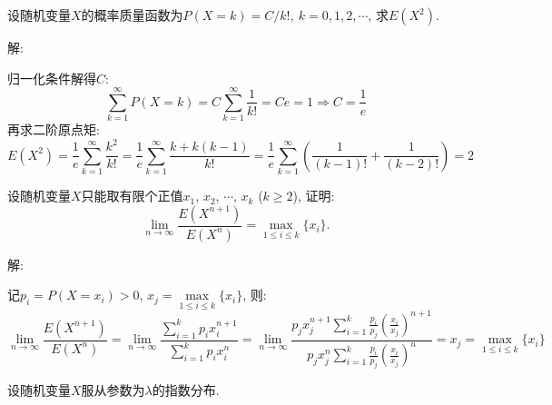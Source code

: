 \documentclass[standard]{ExBook}
\begin{document}
\begin{qitems}
\vspace{-5em}

    \begin{bbox}
    \begin{shaded}
        \qitem
设随机变量$X$的概率质量函数为$P(X=k)=C/k!,\ k=0,1,2,\cdots$, 求$E(X^2)$.
    \end{shaded}
    \end{bbox}

\vspace{-5em}

    \begin{bbox}
解: 

归一化条件解得$C$:
$$\sum\limits_{k=1}^{\infty}P(X=k)=C\sum\limits_{k=1}^{\infty}\frac{1}{k!}=Ce=1 \Longrightarrow C=\frac{1}{e}$$
再求二阶原点矩:
$$E(X^2)=\frac{1}{e}\sum\limits_{k=1}^{\infty}\frac{k^2}{k!}=\frac{1}{e}\sum\limits_{k=1}^{\infty}\frac{k+k(k-1)}{k!}=\frac{1}{e}\sum\limits_{k=1}^{\infty}\left(\frac{1}{(k-1)!}+\frac{1}{(k-2)!}\right)=2$$
    \end{bbox}

\vspace{-5em}

    \begin{bbox}
    \begin{shaded}
        \qitem
设随机变量$X$只能取有限个正值$x_1$, $x_2$, $\cdots$, $x_k$ ($k\geq 2$), 证明:
$$\lim\limits_{n\to\infty}\displaystyle\frac{E(X^{n+1})}{E(X^{n})}=\max\limits_{1\leq i\leq k}\{x_i\}.$$
    \end{shaded}
    \end{bbox}

\vspace{-5em}

    \begin{bbox}
解: 

记$p_i=P(X=x_i)>0$, $x_j=\max\limits_{1\leq i\leq k}\{x_i\}$, 则:
$$\lim\limits_{n\to\infty}\displaystyle\frac{E(X^{n+1})}{E(X^{n})}=\lim\limits_{n\to\infty}\frac{\sum\limits_{i=1}^{k}p_{i}x_{i}^{n+1}}{\sum\limits_{i=1}^{k}p_{i}x_{i}^{n}}=\lim\limits_{n\to\infty}\frac{\displaystyle p_{j} x_{j}^{n+1}\sum\limits_{i=1}^{k}\frac{p_i}{p_j}\left(\frac{x_i}{x_j}\right)^{n+1}}{\displaystyle p_{j} x_{j}^{n}\sum\limits_{i=1}^{k}\frac{p_i}{p_j}\left(\frac{x_i}{x_j}\right)^{n}}=x_j=\max\limits_{1\leq i\leq k}\{x_i\}$$
    \end{bbox}

\vspace{-5em}

    \begin{bbox}
    \begin{shaded}
        \qitem
设随机变量$X$服从参数为$\lambda$的指数分布.


\end{shaded}
\end{bbox}
\end{qitems}
\end{document}
